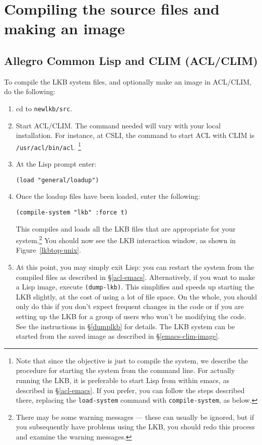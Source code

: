 \documentclass[12pt]{report}
\begin{document}
\section{Compiling the source files and making an image}
\label{src}

\subsection{Allegro Common Lisp and CLIM (ACL/CLIM)}
\label{acl-src}

To compile the LKB system files, and optionally make an image
in ACL/CLIM, do the following:
\begin{enumerate}
\item cd to \verb+newlkb/src+.  
\item Start ACL/CLIM.  The command needed will vary with your local
installation.  For instance,
at CSLI, the command to start ACL with CLIM is \verb+/usr/acl/bin/acl+.
\footnote{Note that since the objective is just to compile the system,
we describe the procedure for
starting the system from the command line.  For actually running the LKB,
it is preferable to start Lisp from within emacs, as described
in \S\ref{acl-emacs}.  If you prefer, you can follow the steps described
there, replacing the {\tt load-system} command with {\tt compile-system},
as below.}
\item At the Lisp prompt enter:
\begin{verbatim}
(load "general/loadup") 
\end{verbatim}
\item Once the loadup files have been loaded, enter the following:
\begin{verbatim}
(compile-system "lkb" :force t)
\end{verbatim}
This compiles and loads all the LKB files that are appropriate for
your system.\footnote{There may be
some warning messages --- these can usually be ignored, but if you subsequently
have problems using the LKB, you should redo this process
and examine the warning messages.}
You
should now see the LKB interaction window, as shown in 
Figure~\ref{lkbtop-unix}.
\item At this point, you may simply exit Lisp:
you can restart the system from the compiled files
as described in \S\ref{acl-emacs}.
Alternatively, if you want to make a Lisp image, execute \verb+(dump-lkb)+.
This simplifies and speeds up starting the LKB slightly, at the cost of
using a lot of file space.
On the whole, you should only do this if you don't expect
frequent changes in the code or if you are setting up the LKB for
a group of users who won't be modifying the code.
See the instructions in \S\ref{dumplkb} for details.
The LKB system can be started from the saved image as described in 
\S\ref{emacs-clim-image}.
\end{enumerate}
\end{document}
